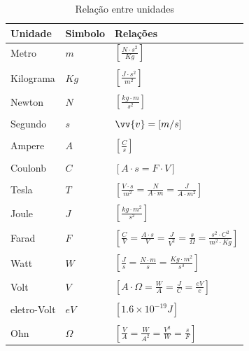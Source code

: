 \documentclass[12pt,oneside,a4paper]{abntex2}
\begin{document}
    \begin{table}[ht]
    \caption{Relação entre unidades}
    \label{tabela1}
    \begin{center}
    \begin{tabular}{lll}
    \hline 
    Unidade & Simbolo & Relações \\ 
    \hline 
    Metro & $m$  & $\left[ \frac{N \cdot s^2}{Kg} \right]$ \\ 
     \\
    Kilograma  & $Kg$ & $\left[ \frac{J \cdot s^2}{m^2} \right]$  \\ 
     \\
    Newton & $N$  & $\left[  \frac{kg \cdot m}{s^2}\right]$ \\ 
     \\   
    Segundo & $s$  & $\vv{v} = \left[ m/s \right]$ \\ 
     \\
    Ampere & $A$  & $\left[ \frac{C}{s}\right]$ \\ 
     \\
    Coulonb & $C$  & $\left[ A \cdot s = F \cdot V\right]$ \\ 
     \\
    Tesla & $T$  & $\left[ \frac{V \cdot s}{m^2} = \frac{N}{A \cdot m} = \frac{J}{A \cdot m^2} \right]$ \\ 
     \\
    Joule & $J$  & $\left[ \frac{kg \cdot m^2}{s^2} \right]$ \\ 
    \\
    Farad & $F$  & $\left[ \frac{C}{V} = \frac{A \cdot s}{V} = \frac{J}{V^2} = \frac{s}{\Omega} = \frac{s^2 \cdot C^2}{m^2 \cdot Kg} \right]$ \\ 
      \\  
    Watt & $W$  & $\left[ \frac{J}{s} = \frac{N \cdot m}{s} = \frac{Kg \cdot m^2}{s^3} \right]$ \\ 
    \\
    Volt & $V$  & $\left[ A \cdot \Omega = \frac{W}{A} = \frac{J}{C} = \frac{eV}{e}\right]$ \\ 
     \\
    eletro-Volt & $eV$  & $\left[ 1.6 \times 10^{-19}J \right]$ \\
    \\
    Ohn & $\Omega$  & $\left[ \frac{V}{A} = \frac{W}{A^2} = \frac{V^2}{W} = \frac{s}{F} \right]$ \\ 
  
      
    \hline
    
    \end{tabular}
    \end{center}         
    \end{table}
    
\endgroup



\end{document}
